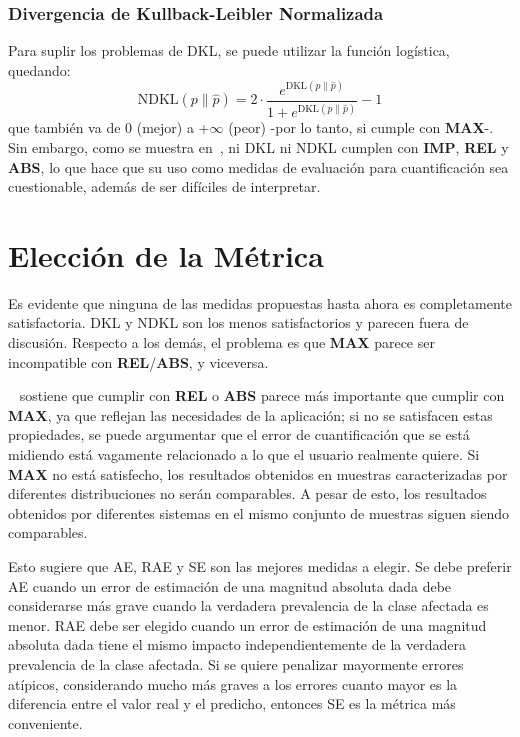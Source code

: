 \subsubsection{Divergencia de Kullback-Leibler
Normalizada}\label{evaluacion:ndkl}

Para suplir los problemas de DKL, se puede utilizar la función logística,
quedando:
\begin{equation}
    {\text{NDKL}}(p\parallel \hat{p}) = 2 \cdot \frac{e^{{\text{DKL}}(p\parallel \hat{p})}}{1+e^{{\text{DKL}}(p\parallel \hat{p})}}-1\label{evaluacion:eq_ndkl}
\end{equation}
que también va de {0} (mejor) a {+$\infty$} (peor) -por lo tanto, si cumple con
{\bf MAX}-. Sin embargo, como se muestra en~\cite{sebastiani2020evaluation}, ni
DKL ni NDKL cumplen con {\bf IMP}, {\bf REL} y {\bf ABS}, lo que hace que su uso
como medidas de evaluación para cuantificación sea cuestionable, además de ser
difíciles de interpretar.

\section{Elección de la Métrica}\label{evaluacion:eleccion}

Es evidente que ninguna de las medidas propuestas hasta ahora es completamente
satisfactoria. DKL y NDKL son los menos satisfactorios y parecen fuera de
discusión. Respecto a los demás, el problema es que {\bf MAX} parece ser
incompatible con {\bf REL}/{\bf ABS}, y viceversa.

~\citet{sebastiani2020evaluation} sostiene que cumplir con {\bf REL} o {\bf ABS}
parece más importante que cumplir con {\bf MAX}, ya que reflejan las necesidades
de la aplicación; si no se satisfacen estas propiedades, se puede argumentar que
el error de cuantificación que se está midiendo está vagamente relacionado a lo
que el usuario realmente quiere. Si {\bf MAX} no está satisfecho, los resultados
obtenidos en muestras caracterizadas por diferentes distribuciones no serán
comparables. A pesar de esto, los resultados obtenidos por diferentes sistemas
en el mismo conjunto de muestras siguen siendo comparables.

Esto sugiere que AE, RAE y SE son las mejores medidas a elegir. Se debe preferir
AE cuando un error de estimación de una magnitud absoluta dada debe considerarse
más grave cuando la verdadera prevalencia de la clase afectada es menor. RAE
debe ser elegido cuando un error de estimación de una magnitud absoluta dada
tiene el mismo impacto independientemente de la verdadera prevalencia de la
clase afectada. Si se quiere penalizar mayormente errores atípicos, considerando
mucho más graves a los errores cuanto mayor es la diferencia entre el valor real
y el predicho, entonces SE es la métrica más conveniente.

